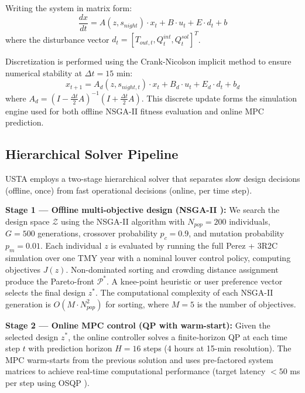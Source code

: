 \documentclass[preprint,12pt]{elsarticle}
\begin{document}
Writing the system in matrix form:
\begin{equation}
\label{eq:matrix}
\frac{dx}{dt} = A(z, s_{night}) \cdot x_t + B \cdot u_t + E \cdot d_t + b
\end{equation}
where the disturbance vector $d_t = [T_{out,t}, Q^{int}_t, Q^{sol}_t]^T$.

Discretization is performed using the Crank-Nicolson implicit method to ensure numerical stability at $\Delta t = 15$ min:
\begin{equation}
\label{eq:discrete}
x_{t+1} = A_d(z, s_{night,t}) \cdot x_t + B_d \cdot u_t + E_d \cdot d_t + b_d
\end{equation}
where $A_d = (I - \frac{\Delta t}{2} A)^{-1}(I + \frac{\Delta t}{2} A)$. This discrete update forms the simulation engine used for both offline NSGA-II fitness evaluation and online MPC prediction.

\subsection{Hierarchical Solver Pipeline}

USTA employs a two-stage hierarchical solver that separates slow design decisions (offline, once) from fast operational decisions (online, per time step).

\textbf{Stage 1 --- Offline multi-objective design (NSGA-II \cite{deb2002}):} We search the design space $\mathcal{Z}$ using the NSGA-II algorithm with $N_{pop} = 200$ individuals, $G = 500$ generations, crossover probability $p_c = 0.9$, and mutation probability $p_m = 0.01$. Each individual $z$ is evaluated by running the full Perez + 3R2C simulation over one TMY year with a nominal louver control policy, computing objectives $J(z)$. Non-dominated sorting and crowding distance assignment produce the Pareto-front $\mathcal{P}^*$. A knee-point heuristic or user preference vector selects the final design $z^*$. The computational complexity of each NSGA-II generation is $O(M \cdot N_{pop}^2)$ for sorting, where $M = 5$ is the number of objectives.

\textbf{Stage 2 --- Online MPC control (QP with warm-start):} Given the selected design $z^*$, the online controller solves a finite-horizon QP at each time step $t$ with prediction horizon $H = 16$ steps (4 hours at 15-min resolution). The MPC warm-starts from the previous solution and uses pre-factored system matrices to achieve real-time computational performance (target latency $< 50$ ms per step using OSQP \cite{stellato2020}).
\end{document}
